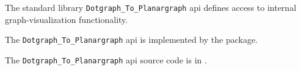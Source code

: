 
The standard library {\tt Dotgraph\_To\_Planargraph} api defines access to internal graph-visualization functionality. 

The {\tt Dotgraph\_To\_Planargraph} api is implemented by the  package. 

The {\tt Dotgraph\_To\_Planargraph} api source code is in .


